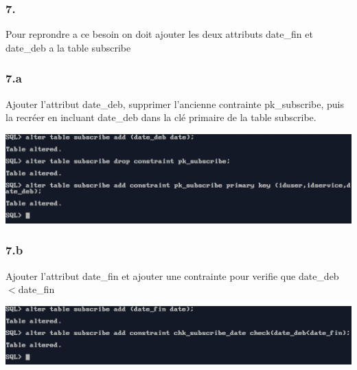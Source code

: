 \subsubsection*{7.}
Pour reprondre a ce besoin on doit ajouter les deux attributs date\_fin et date\_deb a la table subscribe

\vspace{0.25cm}
\subsubsection*{7.a}
Ajouter l'attribut date\_deb, supprimer l'ancienne contrainte pk\_subscribe, puis la recréer en incluant date\_deb dans la clé primaire de la table subscribe.


\begin{center}
    \includegraphics[width=\textwidth]{ScreenShot/Partie2/deb.png}
\end{center}

\newpage
\subsubsection*{7.b}
Ajouter l'attribut date\_fin et ajouter une contrainte pour verifie que date\_deb\(<\)date\_fin



\begin{center}
    \includegraphics[width=\textwidth]{ScreenShot/Partie2/fin.png}
\end{center}
